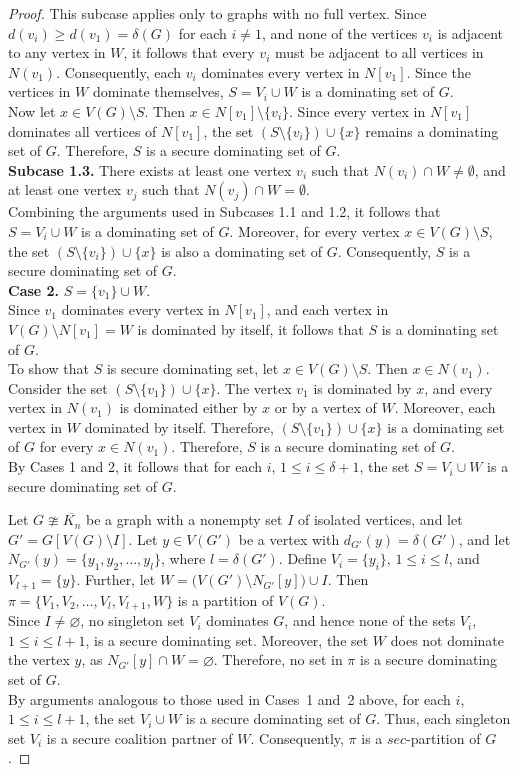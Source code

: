 \documentclass[12pt]{article}
\begin{document}
\begin{proof}
This subcase applies only to graphs with no full vertex. Since
$d(v_i)\ge d(v_1)=\delta(G)$ for each $i\neq 1$, and none of the vertices $v_i$ is adjacent to any vertex in $W$, it follows that every $v_i$ must be adjacent to all vertices in $N(v_1)$. Consequently, each $v_i$ dominates every vertex in $N[v_1]$. Since the vertices in $W$ dominate themselves, $S=V_i\cup W$ is a dominating set of $G$.\\
Now let $x\in V(G)\setminus S$. Then $x\in N[v_1]\setminus\{v_i\}$. Since every vertex in $N[v_1]$ dominates all vertices of $N[v_1]$, the set $(S\setminus\{v_i\})\cup\{x\}$
remains a dominating set of $G$. Therefore, $S$ is a secure dominating set of $G$.\\[2mm]
\textbf{Subcase 1.3.} There exists at least one vertex $v_i$ such that $N(v_i)\cap W\neq\emptyset$, and at least one vertex $v_j$ such that $N(v_j)\cap W=\emptyset$.\\
Combining the arguments used in Subcases 1.1 and 1.2, it follows that \(S=V_i\cup W\) is a dominating set of $G$. Moreover, for every vertex $x\in V(G)\setminus S$, the set
$(S\setminus\{v_i\})\cup\{x\}$ is also a dominating set of $G$. Consequently, $S$ is a secure dominating set of $G$.\\[2mm]
\textbf{Case 2.} $S=\{v_1\}\cup W$.\\
Since $v_1$ dominates every vertex in $N[v_1]$, and each vertex in
$V(G)\setminus N[v_1]=W$ is dominated by itself, it follows that $S$ is a dominating set of $G$.\\
To show that $S$ is secure dominating set, let $x\in V(G)\setminus S$. Then $x\in N(v_1)$. Consider the set
$(S\setminus\{v_1\})\cup\{x\}$. The vertex $v_1$ is dominated by $x$, and every vertex in $N(v_1)$ is dominated either by $x$ or by a vertex of $W$. Moreover, each vertex in $W$ dominated by itself. Therefore,
$(S\setminus\{v_1\})\cup\{x\}$ is a dominating set of $G$ for every $x\in N(v_1)$. Therefore, $S$ is a secure dominating set of $G$.\\
By Cases 1 and 2, it follows that for each $i$, $1\le i\le \delta+1$, the set $S=V_i\cup W$ is a secure dominating set of $G$.\par
Let $G\ncong \overline{K_n}$ be a graph with a nonempty set $I$ of isolated vertices, and let $G'=G[V(G)\setminus I]$. Let $y\in V(G')$ be a vertex with $d_{G'}(y)=\delta(G')$, and let
$N_{G'}(y)=\{y_1,y_2,\ldots,y_l\}$, where $l=\delta(G')$. Define $V_i=\{y_i\}$, $1\le i\le l$, and $V_{l+1}=\{y\}$. Further, let $W=\bigl(V(G')\setminus N_{G'}[y]\bigr)\cup I$.
Then $\pi=\{V_1,V_2,\ldots,V_l,V_{l+1},W\}$
is a partition of $V(G)$.\\[2mm]
Since $I\neq\varnothing$, no singleton set $V_i$ dominates $G$, and hence none of the sets $V_i$, $1\le i\le l+1$, is a secure dominating set. Moreover, the set $W$ does not dominate the vertex $y$, as $N_{G'}[y]\cap W=\varnothing$.
Therefore, no set in $\pi$ is a secure dominating set of $G$.\\
By arguments analogous to those used in Cases~1 and~2 above, for each $i$, $1\le i\le l+1$, the set $V_i\cup W$
is a secure dominating set of $G$. Thus, each singleton set $V_i$ is a secure coalition partner of $W$. Consequently, $\pi$ is a $sec$-partition of $G$. 
    \end{proof}
\end{document}
